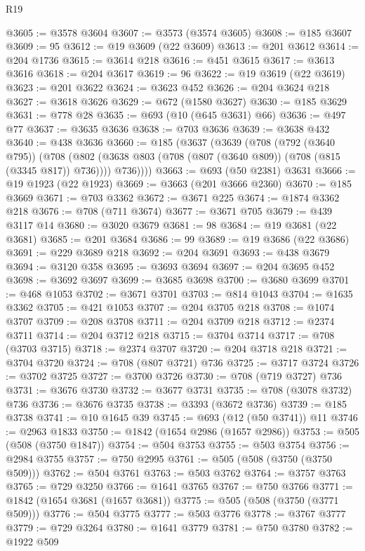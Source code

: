 \begin{lexlean}{R19}
\begin{coremodule}
{{{{{{{{{{{@3605 := @3578 @3604
@3607 := @3573 (@3574 @3605)
@3608 := @185 @3607
@3609 := 95
@3612 := @19 @3609 (@22 @3609)
@3613 := @201 @3612
@3614 := @204 @1736
@3615 := @3614 @218
@3616 := @451 @3615
@3617 := @3613 @3616
@3618 := @204 @3617
@3619 := 96
@3622 := @19 @3619 (@22 @3619)
@3623 := @201 @3622
@3624 := @3623 @452
@3626 := @204 @3624 @218
@3627 := @3618 @3626
@3629 := @672 (@1580 @3627)
@3630 := @185 @3629
@3631 := @778 @28
@3635 := @693 (@10 (@645 @3631) @66)
@3636 := @497 @77
@3637 := @3635 @3636
@3638 := @703 @3636
@3639 := @3638 @432
@3640 := @438 @3636
@3660 := @185
    (@3637
      (@3639
        (@708
          (@792 (@3640 @795))
          (@708
            (@802 (@3638 @803 (@708 (@807 (@3640 @809)) (@708 (@815 (@3345 @817)) @736))))
            @736))))
@3663 := @693 (@50 @2381) @3631
@3666 := @19 @1923 (@22 @1923)
@3669 := @3663 (@201 @3666 @2360)
@3670 := @185 @3669
@3671 := @703 @3362
@3672 := @3671 @225
@3674 := @1874 @3362 @218
@3676 := @708 (@711 @3674)
@3677 := @3671 @705
@3679 := @439 @3117 @14
@3680 := @3020 @3679
@3681 := 98
@3684 := @19 @3681 (@22 @3681)
@3685 := @201 @3684
@3686 := 99
@3689 := @19 @3686 (@22 @3686)
@3691 := @229 @3689 @218
@3692 := @204 @3691
@3693 := @438 @3679
@3694 := @3120 @358
@3695 := @3693 @3694
@3697 := @204 @3695 @452
@3698 := @3692 @3697
@3699 := @3685 @3698
@3700 := @3680 @3699
@3701 := @468 @1053
@3702 := @3671 @3701
@3703 := @814 @1043
@3704 := @1635 @3362
@3705 := @421 @1053
@3707 := @204 @3705 @218
@3708 := @1074 @3707
@3709 := @208 @3708
@3711 := @204 @3709 @218
@3712 := @2374 @3711
@3714 := @204 @3712 @218
@3715 := @3704 @3714
@3717 := @708 (@3703 @3715)
@3718 := @2374 @3707
@3720 := @204 @3718 @218
@3721 := @3704 @3720
@3724 := @708 (@807 @3721) @736
@3725 := @3717 @3724
@3726 := @3702 @3725
@3727 := @3700 @3726
@3730 := @708 (@719 @3727) @736
@3731 := @3676 @3730
@3732 := @3677 @3731
@3735 := @708 (@3078 @3732) @736
@3736 := @3676 @3735
@3738 := @3393 (@3672 @3736)
@3739 := @185 @3738
@3741 := @10 @1645 @39
@3745 := @693 (@12 (@50 @3741)) @11
@3746 := @2963 @1833
@3750 := @1842 (@1654 @2986 (@1657 @2986))
@3753 := @505 (@508 (@3750 @1847))
@3754 := @504 @3753
@3755 := @503 @3754
@3756 := @2984 @3755
@3757 := @750 @2995
@3761 := @505 (@508 (@3750 (@3750 @509)))
@3762 := @504 @3761
@3763 := @503 @3762
@3764 := @3757 @3763
@3765 := @729 @3250
@3766 := @1641 @3765
@3767 := @750 @3766
@3771 := @1842 (@1654 @3681 (@1657 @3681))
@3775 := @505 (@508 (@3750 (@3771 @509)))
@3776 := @504 @3775
@3777 := @503 @3776
@3778 := @3767 @3777
@3779 := @729 @3264
@3780 := @1641 @3779
@3781 := @750 @3780
@3782 := @1922 @509
}}}}}}}}}}}
\end{coremodule}
\end{lexlean}
